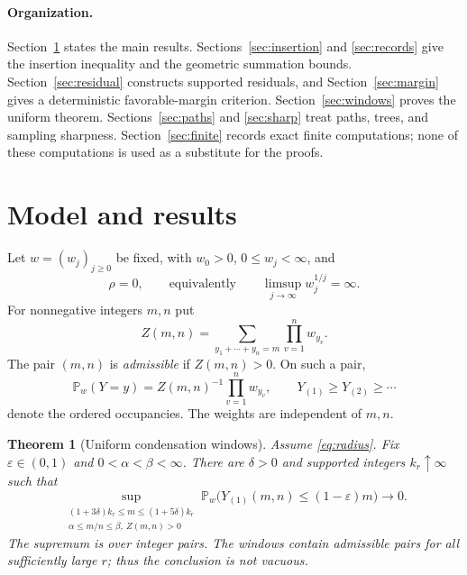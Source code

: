 \documentclass[11pt]{amsart}
\newtheorem{theorem}{Theorem}[section]
\theoremstyle{remark}\newtheorem{remark}[theorem]{Remark}
\newcommand{\Pp}{\mathbb P}
\begin{document}
\paragraph{Organization.}
Section~\ref{sec:results} states the main results. Sections~\ref{sec:insertion}
and \ref{sec:records} give the insertion inequality and the geometric
summation bounds. Section~\ref{sec:residual} constructs supported residuals,
and Section~\ref{sec:margin} gives a deterministic favorable-margin
criterion. Section~\ref{sec:windows} proves the uniform theorem.
Sections~\ref{sec:paths} and \ref{sec:sharp} treat paths, trees, and sampling
sharpness. Section~\ref{sec:finite} records exact finite computations; none
of these computations is used as a substitute for the proofs.


\section{Model and results}\label{sec:results}
Let $w=(w_j)_{j\ge0}$ be fixed, with $w_0>0$, $0\le w_j<\infty$, and
\begin{equation}\label{eq:radius}
 \rho=0,\qquad\text{equivalently}\qquad
 \limsup_{j\to\infty}w_j^{1/j}=\infty.
\end{equation}
For nonnegative integers $m,n$ put
\[
 Z(m,n)=\sum_{y_1+\cdots+y_n=m}\prod_{v=1}^n w_{y_v}.
\]
The pair $(m,n)$ is \emph{admissible} if $Z(m,n)>0$. On such a pair,
\[
 \Pp_w(Y=y)=Z(m,n)^{-1}\prod_{v=1}^n w_{y_v},
 \qquad Y_{(1)}\ge Y_{(2)}\ge\cdots
\]
denote the ordered occupancies. The weights are independent of $m,n$.

\begin{theorem}[Uniform condensation windows]\label{thm:windows}
Assume \eqref{eq:radius}. Fix $\varepsilon\in(0,1)$ and
$0<\alpha<\beta<\infty$. There are $\delta>0$ and supported integers
$k_r\uparrow\infty$ such that
\begin{equation}\label{eq:uniform}
 \sup_{\substack{(1+3\delta)k_r\le m\le(1+5\delta)k_r\\
                  \alpha\le m/n\le\beta,\ Z(m,n)>0}}
 \Pp_w\bigl(Y_{(1)}(m,n)\le(1-\varepsilon)m\bigr)
 \longrightarrow0.
\end{equation}
The supremum is over integer pairs. The windows contain admissible pairs
for all sufficiently large $r$; thus the conclusion is not vacuous.
\end{theorem}
\end{document}
